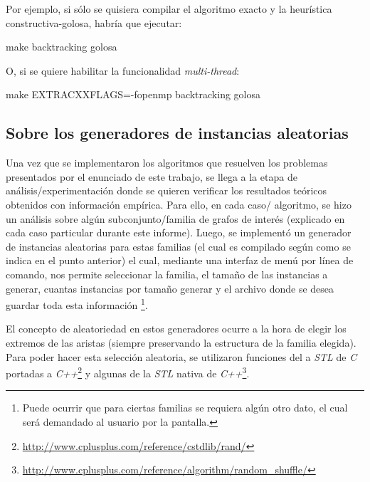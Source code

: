 \par Por ejemplo, si s\'olo se quisiera compilar el algoritmo exacto
    y la heur\'istica constructiva-golosa, habr\'ia que ejecutar:

\bigskip
\par make backtracking golosa
\bigskip

\bigskip
\par O, si se quiere habilitar la funcionalidad \emph{multi-thread}:
\bigskip
\par make EXTRACXXFLAGS=-fopenmp backtracking golosa

{}
\subsection*{Sobre los generadores de instancias aleatorias}
\par Una vez que se implementaron los algoritmos que resuelven los problemas
    presentados por el enunciado de este trabajo, se llega a la etapa de
    an\'alisis/experimentaci\'on donde se quieren verificar los resultados
    te\'oricos obtenidos con informaci\'on emp\'irica. Para ello, en cada caso/%
    algoritmo, se hizo un an\'alisis sobre alg\'un subconjunto/familia de grafos
    de inter\'es (explicado en cada caso particular durante este informe). Luego,
    se implement\'o un generador de instancias aleatorias para estas familias
    (el cual es compilado seg\'un como se indica en el punto anterior) el cual,
    mediante una interfaz de men\'u por l\'inea de comando, nos permite seleccionar
    la familia, el tama\~no de las instancias a generar, cuantas instancias por
    tama\~no generar y el archivo donde se desea guardar toda esta informaci\'on%
    \footnote{Puede ocurrir que para ciertas familias se requiera alg\'un otro dato,
    el cual ser\'a demandado al usuario por la pantalla.}.

\par El concepto de aleatoriedad en estos generadores ocurre a la hora de elegir
    los extremos de las aristas (siempre preservando la estructura de la familia
    elegida). Para poder hacer esta selecci\'on aleatoria, se utilizaron funciones
    del a \emph{STL} de \emph{C} portadas a \emph{C++}\footnote{%
    \url{http://www.cplusplus.com/reference/cstdlib/rand/}} y algunas de la
    \emph{STL} nativa de \emph{C++}\footnote{%
    \url{http://www.cplusplus.com/reference/algorithm/random_shuffle/}}.

